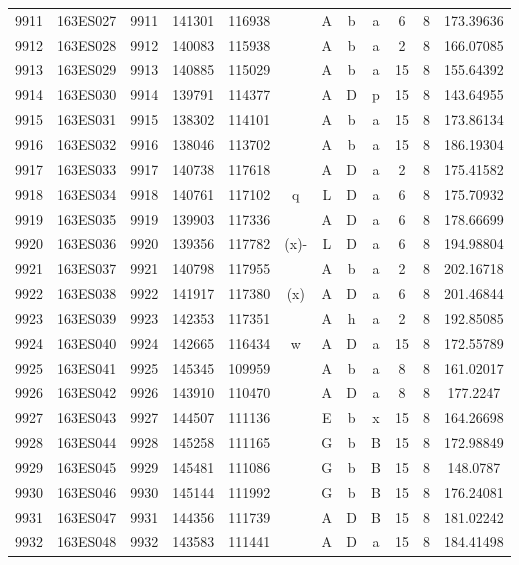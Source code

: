 \begin{tabular}{|*{12}{c|}}
9911 & 163ES027 & 9911 & 141301 & 116938 &  & A & b & a & 6 & 8 & 173.39636 \\ 
9912 & 163ES028 & 9912 & 140083 & 115938 &  & A & b & a & 2 & 8 & 166.07085 \\ 
9913 & 163ES029 & 9913 & 140885 & 115029 &  & A & b & a & 15 & 8 & 155.64392 \\ 
9914 & 163ES030 & 9914 & 139791 & 114377 &  & A & D & p & 15 & 8 & 143.64955 \\ 
9915 & 163ES031 & 9915 & 138302 & 114101 &  & A & b & a & 15 & 8 & 173.86134 \\ 
9916 & 163ES032 & 9916 & 138046 & 113702 &  & A & b & a & 15 & 8 & 186.19304 \\ 
9917 & 163ES033 & 9917 & 140738 & 117618 &  & A & D & a & 2 & 8 & 175.41582 \\ 
9918 & 163ES034 & 9918 & 140761 & 117102 & q & L & D & a & 6 & 8 & 175.70932 \\ 
9919 & 163ES035 & 9919 & 139903 & 117336 &  & A & D & a & 6 & 8 & 178.66699 \\ 
9920 & 163ES036 & 9920 & 139356 & 117782 & (x)- & L & D & a & 6 & 8 & 194.98804 \\ 
9921 & 163ES037 & 9921 & 140798 & 117955 &  & A & b & a & 2 & 8 & 202.16718 \\ 
9922 & 163ES038 & 9922 & 141917 & 117380 & (x) & A & D & a & 6 & 8 & 201.46844 \\ 
9923 & 163ES039 & 9923 & 142353 & 117351 &  & A & h & a & 2 & 8 & 192.85085 \\ 
9924 & 163ES040 & 9924 & 142665 & 116434 & w & A & D & a & 15 & 8 & 172.55789 \\ 
9925 & 163ES041 & 9925 & 145345 & 109959 &  & A & b & a & 8 & 8 & 161.02017 \\ 
9926 & 163ES042 & 9926 & 143910 & 110470 &  & A & D & a & 8 & 8 & 177.2247 \\ 
9927 & 163ES043 & 9927 & 144507 & 111136 &  & E & b & x & 15 & 8 & 164.26698 \\ 
9928 & 163ES044 & 9928 & 145258 & 111165 &  & G & b & B & 15 & 8 & 172.98849 \\ 
9929 & 163ES045 & 9929 & 145481 & 111086 &  & G & b & B & 15 & 8 & 148.0787 \\ 
9930 & 163ES046 & 9930 & 145144 & 111992 &  & G & b & B & 15 & 8 & 176.24081 \\ 
9931 & 163ES047 & 9931 & 144356 & 111739 &  & A & D & B & 15 & 8 & 181.02242 \\ 
9932 & 163ES048 & 9932 & 143583 & 111441 &  & A & D & a & 15 & 8 & 184.41498 \\ 

\end{tabular}
